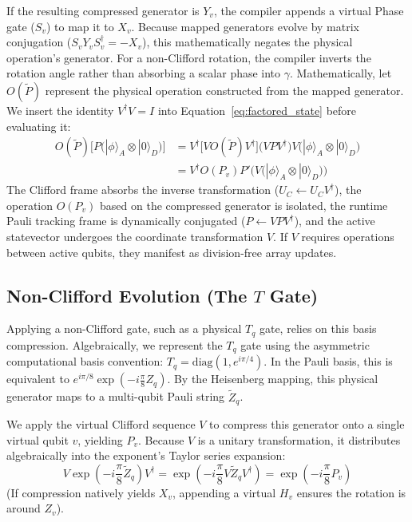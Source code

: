 \documentclass[11pt]{article}
\begin{document}
If the resulting compressed generator is $Y_v$, the compiler appends a virtual Phase gate ($S_v$) to map it to $X_v$. Because mapped generators evolve by matrix conjugation ($S_v Y_v S_v^\dagger = -X_v$), this mathematically negates the physical operation's generator. For a non-Clifford rotation, the compiler inverts the rotation angle rather than absorbing a scalar phase into $\gamma$.
Mathematically, let $O(\tilde{P})$ represent the physical operation constructed from the mapped generator. We insert the identity $V^\dagger V = I$ into Equation~\ref{eq:factored_state} before evaluating it:
\begin{align}
    O(\tilde{P}) \Big[ P \Big( |\phi\rangle_A \otimes |0\rangle_D \Big) \Big] &= V^\dagger \Big[ V O(\tilde{P}) V^\dagger \Big] \big(V P V^\dagger \big) V \Big( |\phi\rangle_A \otimes |0\rangle_D \Big) \nonumber \\
    &= V^\dagger O(P_v) P' \Big( V \big( |\phi\rangle_A \otimes |0\rangle_D \big) \Big)
\end{align}
The Clifford frame absorbs the inverse transformation ($U_C \leftarrow U_C V^\dagger$), the operation $O(P_v)$ based on the compressed generator is isolated, the runtime Pauli tracking frame is dynamically conjugated ($P \leftarrow V P V^\dagger$), and the active statevector undergoes the coordinate transformation $V$. If $V$ requires operations between active qubits, they manifest as division-free array updates.

\subsection{Non-Clifford Evolution (The $T$ Gate)}
\label{sec:t_gate}

Applying a non-Clifford gate, such as a physical $T_q$ gate, relies on this basis compression. Algebraically, we represent the $T_q$ gate using the asymmetric computational basis convention: $T_q = \text{diag}(1, e^{i\pi/4})$. In the Pauli basis, this is equivalent to $e^{i\pi/8}\exp(-i \frac{\pi}{8} Z_q)$. By the Heisenberg mapping, this physical generator maps to a multi-qubit Pauli string $\tilde{Z}_q$.

We apply the virtual Clifford sequence $V$ to compress this generator onto a single virtual qubit $v$, yielding $P_v$. Because $V$ is a unitary transformation, it distributes algebraically into the exponent's Taylor series expansion:
\begin{equation}
    V \exp\left(-i \frac{\pi}{8} \tilde{Z}_q\right) V^\dagger = \exp\left(-i \frac{\pi}{8} V \tilde{Z}_q V^\dagger\right) = \exp\left(-i \frac{\pi}{8} P_v\right)
\end{equation}
(If compression natively yields $X_v$, appending a virtual $H_v$ ensures the rotation is around $Z_v$).
\end{document}
